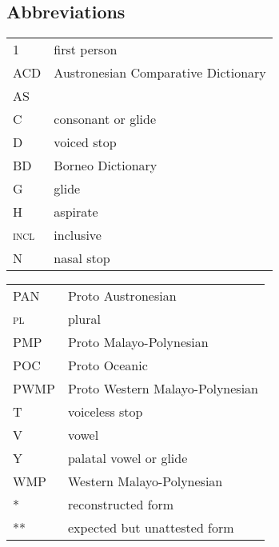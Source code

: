 \documentclass[output=paper]{langscibook}
\begin{document}
\subsection*{Abbreviations}
\begin{tabularx} {.46\textwidth}{lQ}
1     &   first person\\
ACD   &   Austronesian Comparative Dictionary \citep{bltr}\\
AS    &   \citet{Smith2017}\\
C     &   consonant or glide\\
D     &   voiced stop\\
BD    &   Borneo Dictionary\\
G     &   glide\\
H     &   aspirate\\
\textsc{incl}     &   inclusive\\
N     &   nasal stop\\
\end{tabularx}%
\begin{tabularx} {.52\textwidth}{lQ}
PAN   &   Proto Austronesian\\
\textsc{pl}     &  plural\\
PMP   &   Proto Malayo-Polynesian\\
POC   &   Proto Oceanic\\
PWMP  &   Proto Western Malayo-Polynesian\\
T     &   voiceless stop\\
V     &   vowel\\
Y     &   palatal vowel or glide\\
WMP   &   Western Malayo-Polynesian\\
*     &   reconstructed form\\
**    &   {expected but unattested form}
\end{tabularx}

\printbibliography[heading=subbibliography,notkeyword=this]
\end{document}
